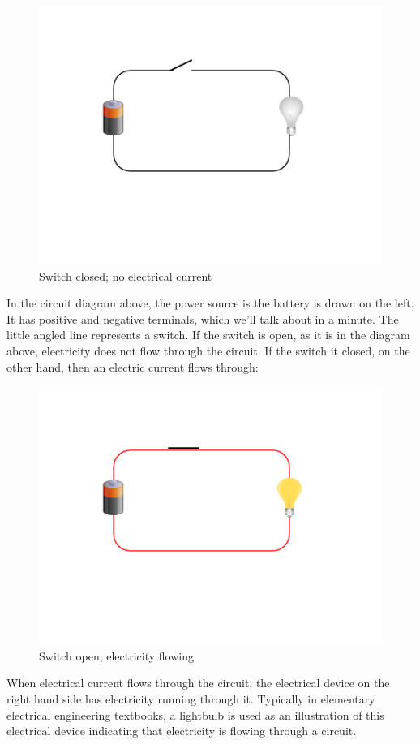 \documentclass[UTF8]{book}
\begin{document}
\begin{CJK}{UTF8}{gbsn}
\begin{figure}[H]
\centering
\includegraphics[width=0.8\linewidth]{circuit1}
\caption{Switch closed; no electrical current}
\end{figure}


In the circuit diagram above, the power source is the battery is drawn on the left. It has positive and negative terminals, which we'll talk about in a minute. The little angled line represents a switch. If the switch is open, as it is in the diagram above, electricity does not flow through the circuit. If the switch it closed, on the other hand, then an electric current flows through:

\begin{figure}[H]
\centering
\includegraphics[width=0.8\linewidth]{circuit2}
\caption{Switch open; electricity flowing}
\end{figure}

When electrical current flows through the circuit, the electrical device on the right hand side has electricity running through it. Typically in elementary electrical engineering textbooks, a lightbulb is used as an illustration of this electrical device indicating that electricity is flowing through a circuit.


\end{CJK}
\end{document}
